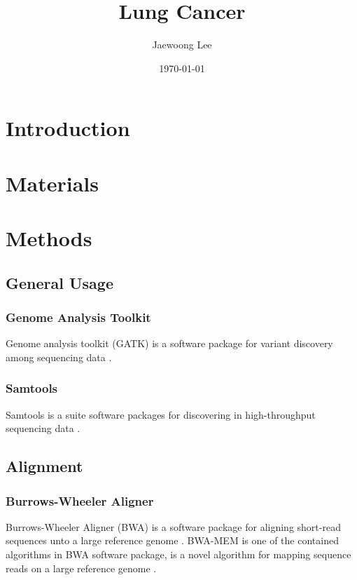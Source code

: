 \documentclass[a4paper]{article}
\title{Lung Cancer}
\author{
    Jaewoong Lee
}
\date{\today}
\begin{document}
    \maketitle
    \newpage

    \tableofcontents
    \listoftables
    \listoffigures
    \newpage

    \section{Introduction}

    \section{Materials}

    \section{Methods}
        \subsection{General Usage}
            \subsubsection{Genome Analysis Toolkit}
                Genome analysis toolkit (GATK) is a software package for variant discovery among sequencing data \cite{gatk1, gatk2}.

            \subsubsection{Samtools}
                Samtools is a suite software packages for discovering in high-throughput sequencing data \cite{samtools1}.

        \subsection{Alignment}
            \subsubsection{Burrows-Wheeler Aligner}
                Burrows-Wheeler Aligner (BWA) is a software package for aligning short-read sequences unto a large reference genome \cite{bwa1}. BWA-MEM is one of the contained algorithms in BWA software package, is a novel algorithm for mapping sequence reads on a large reference genome \cite{bwa2}.
\end{document}
